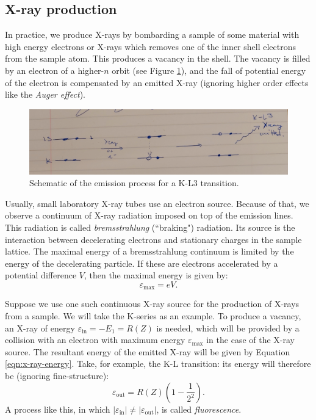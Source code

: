 \documentclass[11pt,a4paper,twoside,onecolumn]{article}
\newcommand{\rydberg}{R}
\begin{document}
\subsection{X-ray production}\label{subsec:x-ray-production}
In practice, we produce X-rays by bombarding a sample of some material with high energy electrons or X-rays which removes one of the inner shell electrons from the sample atom. This produces a vacancy in the shell. The vacancy is filled by an electron of a higher-$n$ orbit (see Figure \ref{fig:emission-diagram}), and the fall of potential energy of the electron is compensated by an emitted X-ray (ignoring higher order effects like the \emph{Auger effect}).

\begin{figure}[!htbp]
    \centering
    \includegraphics[width=\textwidth]{img/emission-diagram.png}
    \caption{Schematic of the emission process for a K-L3 transition.}\label{fig:emission-diagram}
\end{figure}

Usually, small laboratory X-ray tubes use an electron source. Because of that, we observe a continuum of X-ray radiation imposed on top of the emission lines. This radiation is called \emph{bremsstrahlung} (``braking") radiation. Its source is the interaction between decelerating electrons and stationary charges in the sample lattice. The maximal energy of a bremsstrahlung continuum is limited by the energy of the decelerating particle. If these are electrons accelerated by a potential difference $V$, then the maximal energy is given by: 
\begin{equation}\label{eqn:bremss-energy-max}
    \varepsilon_\mathrm{max} = eV.
\end{equation}

Suppose we use one such continuous X-ray source for the production of X-rays from a sample. We will take the K-series as an example. To produce a vacancy, an X-ray of energy $\varepsilon_\mathrm{in} = - E_1 = \rydberg(Z)$ is needed, which will be provided by a collision with an electron with maximum energy $\varepsilon_\mathrm{max}$ in the case of the X-ray source. The resultant energy of the emitted X-ray will be given by Equation \eqref{eqn:x-ray-energy}. Take, for example, the K-L transition: its energy will therefore be (ignoring fine-structure):
\begin{equation}\label{eqn:Kalpha-energy-out}
    \varepsilon_\mathrm{out} = \rydberg\left(Z\right) \left(1 - \frac{1}{2^2}\right).
\end{equation}
A process like this, in which $\left|\varepsilon_\mathrm{in}\right|\neq \left|\varepsilon_\mathrm{out}\right|$, is called \emph{fluorescence}.
\end{document}
